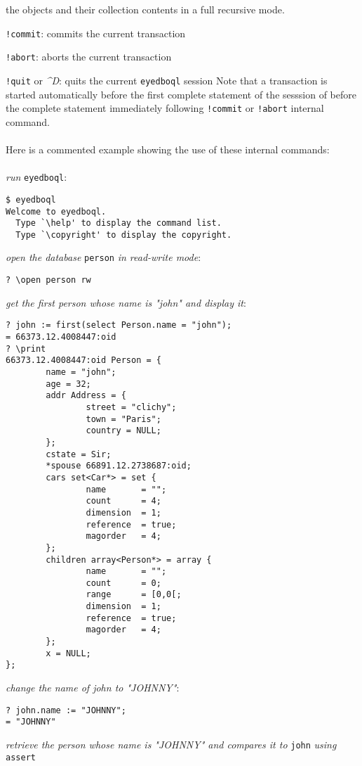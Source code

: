 the objects and their collection contents in a full recursive mode.
\item \texttt{!commit}: commits the current transaction
\item \texttt{!abort}: aborts the current transaction
\item \texttt{!quit} or \emph{\^{}D}: quits the current \texttt{eyedboql} session
\ee
Note that a transaction is started automatically before the first
complete statement of the sesssion of before the complete statement
immediately following \texttt{!commit} or \texttt{!abort} internal command.
\\
\\
Here is a commented example showing the use of these internal commands:\\
\\
\emph{run} \texttt{eyedboql}:
\begin{verbatim}
$ eyedboql
Welcome to eyedboql.
  Type `\help' to display the command list.
  Type `\copyright' to display the copyright.
\end{verbatim}
\emph{open the database} \texttt{person} \emph{in read-write mode}:
\begin{verbatim}
? \open person rw
\end{verbatim}
\emph{get the first person whose name is "john" and display it}:
\begin{verbatim}
? john := first(select Person.name = "john");
= 66373.12.4008447:oid
? \print
66373.12.4008447:oid Person = { 
        name = "john";
        age = 32;
        addr Address = { 
                street = "clichy";
                town = "Paris";
                country = NULL;
        };
        cstate = Sir;
        *spouse 66891.12.2738687:oid;
        cars set<Car*> = set { 
                name       = "";
                count      = 4;
                dimension  = 1;
                reference  = true;
                magorder   = 4;
        };
        children array<Person*> = array { 
                name       = "";
                count      = 0;
                range      = [0,0[;
                dimension  = 1;
                reference  = true;
                magorder   = 4;
        };
        x = NULL;
};
\end{verbatim}
\emph{change the name of john to "JOHNNY"}:
\begin{verbatim}
? john.name := "JOHNNY";
= "JOHNNY"
\end{verbatim}
\emph{retrieve the person whose name is "JOHNNY" and compares it to}
\texttt{john} \emph{using} \texttt{assert}
